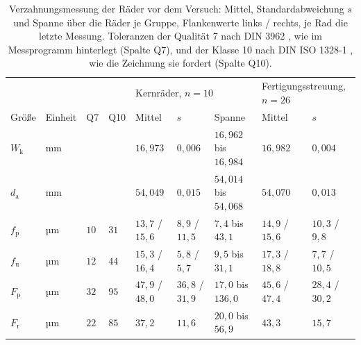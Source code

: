 \begin{table}[htbp]
	\caption{Verzahnungsmessung der Räder vor dem Versuch: Mittel, Standardabweichung $s$ und Spanne über die Räder je Gruppe, Flankenwerte links / rechts, je Rad die letzte Messung. Toleranzen der Qualität 7 nach DIN 3962 \cite[S.~3]{DIN3962-1} \cite[S.~1]{DIN3962-2}, wie im Messprogramm hinterlegt (Spalte Q7), und der Klasse 10 nach DIN ISO 1328-1 \cite[S.~36 bis 37, 53 und 60]{DINISO1328-1}, wie die Zeichnung sie fordert (Spalte Q10).}
	\label{tab:kernraeder_gina}
	\centering
	\footnotesize
	\setlength{\tabcolsep}{3pt}
	\begin{tabular}{lllllllll}
		                       &         &          &            & \multicolumn{3}{l}{Kernräder, $n = 10$} & \multicolumn{2}{l}{Fertigungsstreuung, $n = 26$}                                                                         \\
		Größe                  & Einheit & Q7 & Q10  & Mittel                                  & $s$                                              & Spanne                    & Mittel              & $s$                 \\
		\hline
		\arrayrulecolor{black!30}
		$W_{\mathrm{k}}$       & mm      &          &            & $16{,}973$                              & $0{,}006$                                        & $16{,}962$ bis $16{,}984$ & $16{,}982$          & $0{,}004$           \\
		\hline
		$d_{\mathrm{a}}$       & mm      &          &            & $54{,}049$                              & $0{,}015$                                        & $54{,}014$ bis $54{,}068$ & $54{,}070$          & $0{,}013$           \\
		\hline
		$f_{\mathrm{p}}$       & µm      & $10$     & $31$ & $13{,}7$ / $15{,}6$                     & $8{,}9$ / $11{,}5$                               & $7{,}4$ bis $43{,}1$      & $14{,}9$ / $15{,}6$ & $10{,}3$ / $9{,}8$  \\
		\hline
		$f_{\mathrm{u}}$       & µm      & $12$     & $44$ & $15{,}3$ / $16{,}4$                     & $5{,}8$ / $5{,}7$                                & $9{,}5$ bis $31{,}1$      & $17{,}3$ / $18{,}8$ & $7{,}7$ / $10{,}5$  \\
		\hline
		$F_{\mathrm{p}}$       & µm      & $32$     & $95$ & $47{,}9$ / $48{,}0$                     & $36{,}8$ / $31{,}9$                              & $17{,}0$ bis $136{,}0$    & $45{,}6$ / $47{,}4$ & $28{,}4$ / $30{,}2$ \\
		\hline
		$F_{\mathrm{r}}$       & µm      & $22$     & $85$ & $37{,}2$                                & $11{,}6$                                         & $20{,}0$ bis $56{,}9$     & $43{,}3$            & $15{,}7$            \\

\end{tabular}
\end{table}
